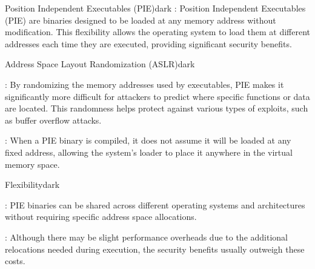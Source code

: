 \label{Position Independent Executables (PIE)}
\begin{baseBoxThree}{Position Independent Executables (PIE)}{dark}
    \bigskip
    : Position Independent Executables (PIE) are binaries designed to be loaded at any memory address without modification. This flexibility allows the operating system to load them at different addresses each time they are executed, providing significant security benefits.
    \bigskip
    \label{Address Space Layout Randomization (ASLR)}
    \begin{baseBoxThree}{Address Space Layout Randomization (ASLR)}{dark}
        \begin{posnexItemize}
            \item[\sA] : By randomizing the memory addresses used by executables, PIE makes it significantly more difficult for attackers to predict where specific functions or data are located. This randomness helps protect against various types of exploits, such as buffer overflow attacks.
            \item[\sA] : When a PIE binary is compiled, it does not assume it will be loaded at any fixed address, allowing the system's loader to place it anywhere in the virtual memory space.
        \end{posnexItemize}
    \end{baseBoxThree}
    \smallskip
    \begin{baseBoxThree}{Flexibility}{dark}
        \begin{posnexItemize}
            \item[\sA] : PIE binaries can be shared across different operating systems and architectures without requiring specific address space allocations.
            \item[\sA] : Although there may be slight performance overheads due to the additional relocations needed during execution, the security benefits usually outweigh these costs.
        \end{posnexItemize}
    \end{baseBoxThree}
    \smallskip
\end{baseBoxThree}


